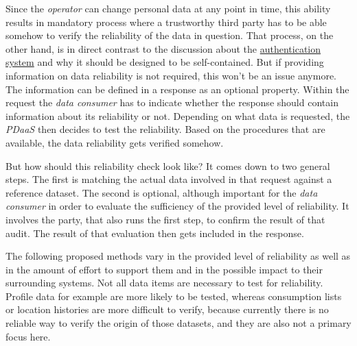\documentclass[12pt,english,a4paper,titlepage,cleardoublepage=empty,dottedtoc]{report}
\begin{document}
Since the \emph{operator} can change personal data at any point in time,
this ability results in mandatory process where a trustworthy third
party has to be able somehow to verify the reliability of the data in
question. That process, on the other hand, is in direct contrast to the
discussion about the \protect\hyperlink{authentication}{authentication
system} and why it should be designed to be self-contained. But if
providing information on data reliability is not required, this won't be
an issue anymore. The information can be defined in a response as an
optional property. Within the request the \emph{data consumer} has to
indicate whether the response should contain information about its
reliability or not. Depending on what data is requested, the
\emph{PDaaS} then decides to test the reliability. Based on the
procedures that are available, the data reliability gets verified
somehow.

But how should this reliability check look like? It comes down to two
general steps. The first is matching the actual data involved in that
request against a reference dataset. The second is optional, although
important for the \emph{data consumer} in order to evaluate the
sufficiency of the provided level of reliability. It involves the party,
that also runs the first step, to confirm the result of that audit. The
result of that evaluation then gets included in the response.

The following proposed methods vary in the provided level of reliability
as well as in the amount of effort to support them and in the possible
impact to their surrounding systems. Not all data items are necessary to
test for reliability. Profile data for example are more likely to be
tested, whereas consumption lists or location histories are more
difficult to verify, because currently there is no reliable way to
verify the origin of those datasets, and they are also not a primary
focus here.
\end{document}
